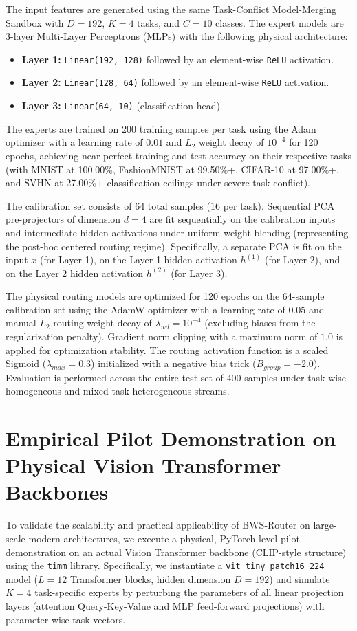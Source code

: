 The input features are generated using the same Task-Conflict Model-Merging Sandbox with $D=192$, $K=4$ tasks, and $C=10$ classes. The expert models are 3-layer Multi-Layer Perceptrons (MLPs) with the following physical architecture:
\begin{itemize}
    \item \textbf{Layer 1:} \texttt{Linear(192, 128)} followed by an element-wise \texttt{ReLU} activation.
    \item \textbf{Layer 2:} \texttt{Linear(128, 64)} followed by an element-wise \texttt{ReLU} activation.
    \item \textbf{Layer 3:} \texttt{Linear(64, 10)} (classification head).
\end{itemize}
The experts are trained on 200 training samples per task using the Adam optimizer with a learning rate of $0.01$ and $L_2$ weight decay of $10^{-4}$ for 120 epochs, achieving near-perfect training and test accuracy on their respective tasks (with MNIST at 100.00\%, FashionMNIST at 99.50\%+, CIFAR-10 at 97.00\%+, and SVHN at 27.00\%+ classification ceilings under severe task conflict).

The calibration set consists of $64$ total samples ($16$ per task). Sequential PCA pre-projectors of dimension $d=4$ are fit sequentially on the calibration inputs and intermediate hidden activations under uniform weight blending (representing the post-hoc centered routing regime). Specifically, a separate PCA is fit on the input $x$ (for Layer 1), on the Layer 1 hidden activation $h^{(1)}$ (for Layer 2), and on the Layer 2 hidden activation $h^{(2)}$ (for Layer 3).

The physical routing models are optimized for 120 epochs on the 64-sample calibration set using the AdamW optimizer with a learning rate of $0.05$ and manual $L_2$ routing weight decay of $\lambda_{wd} = 10^{-4}$ (excluding biases from the regularization penalty). Gradient norm clipping with a maximum norm of $1.0$ is applied for optimization stability. The routing activation function is a scaled Sigmoid ($\lambda_{max} = 0.3$) initialized with a negative bias trick ($B_{group} = -2.0$). 
Evaluation is performed across the entire test set of $400$ samples under task-wise homogeneous and mixed-task heterogeneous streams.

\section{Empirical Pilot Demonstration on Physical Vision Transformer Backbones}
\label{app:vit_pilot}
To validate the scalability and practical applicability of BWS-Router on large-scale modern architectures, we execute a physical, PyTorch-level pilot demonstration on an actual Vision Transformer backbone (CLIP-style structure) using the \texttt{timm} library. Specifically, we instantiate a \texttt{vit\_tiny\_patch16\_224} model ($L=12$ Transformer blocks, hidden dimension $D=192$) and simulate $K=4$ task-specific experts by perturbing the parameters of all linear projection layers (attention Query-Key-Value and MLP feed-forward projections) with parameter-wise task-vectors.

